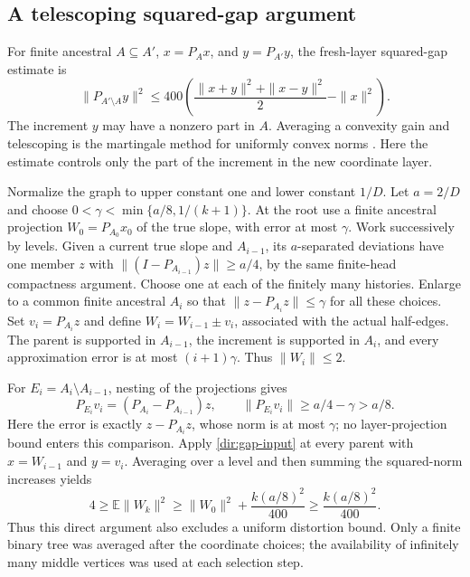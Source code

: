 \subsection{A telescoping squared-gap argument}\label{dir:gap-application}
For finite ancestral $A\subseteq A'$, $x=P_Ax$, and $y=P_{A'}y$, the
fresh-layer squared-gap estimate
\cite[Theorem~5.11]{TreePotentials} is
\begin{equation}\label{dir:gap-input}
 \|P_{A'\setminus A}y\|^2\le
 400\left(\frac{\|x+y\|^2+\|x-y\|^2}{2}-\|x\|^2\right).
\end{equation}
The increment $y$ may have a nonzero part in $A$. Averaging a convexity
gain and telescoping is the martingale method for uniformly convex norms
\cite[Theorem~4.6 and its proof]{Pisier2011}. Here the estimate controls
only the part of the increment in the new coordinate layer.

Normalize the graph to upper constant one and lower constant $1/D$.
Let $a=2/D$ and choose
$0<\gamma<\min\{a/8,1/(k+1)\}$.  At the root use a finite ancestral
projection $W_0=P_{A_0}x_0$ of the true slope, with error at most
$\gamma$.  Work successively by levels.  Given a current true slope
and $A_{i-1}$, its $a$-separated deviations have one member $z$ with
$\|(I-P_{A_{i-1}})z\|\ge a/4$, by the same finite-head compactness
argument.  Choose one at each of the finitely many histories.  Enlarge
to a common finite ancestral $A_i$ so that
$\|z-P_{A_i}z\|\le\gamma$ for all these choices.  Set
$v_i=P_{A_i}z$ and define $W_i=W_{i-1}\pm v_i$, associated with the
actual half-edges.  The parent is supported in $A_{i-1}$, the increment
is supported in $A_i$, and every approximation error is at most
$(i+1)\gamma$.  Thus $\|W_i\|\le2$.

For $E_i=A_i\setminus A_{i-1}$, nesting of the projections gives
\[
 P_{E_i}v_i=(P_{A_i}-P_{A_{i-1}})z,
 \qquad \|P_{E_i}v_i\|\ge a/4-\gamma>a/8.
\]
Here the error is exactly $z-P_{A_i}z$, whose norm is at most
$\gamma$; no layer-projection bound enters this comparison.
Apply \eqref{dir:gap-input} at every parent with $x=W_{i-1}$ and
$y=v_i$.  Averaging over a level and then summing the squared-norm
increases yields
\begin{equation}\label{dir:400-conclusion}
 4\ge\mathbb E\|W_k\|^2
 \ge\|W_0\|^2+\frac{k(a/8)^2}{400}
 \ge\frac{k(a/8)^2}{400}.
\end{equation}
Thus this direct argument also excludes a uniform distortion bound.
Only a finite binary tree was averaged after the coordinate choices;
the availability of infinitely many middle vertices was used at each
selection step.
